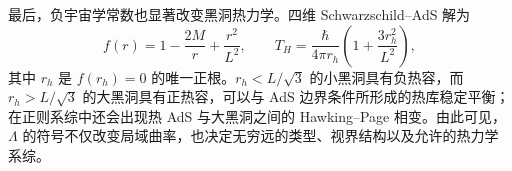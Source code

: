 最后，负宇宙学常数也显著改变黑洞热力学。四维 Schwarzschild--AdS 解为
\begin{equation}\label{eq:schwarzschild-AdS}
    f(r)=1-\frac{2M}{r}+\frac{r^2}{L^2},
    \qquad
    T_H=\frac{\hbar}{4\pi r_h}
      \left(1+\frac{3r_h^2}{L^2}\right),
\end{equation}
其中 $r_h$ 是 $f(r_h)=0$ 的唯一正根。$r_h<L/\sqrt3$ 的小黑洞具有负热容，而 $r_h>L/\sqrt3$ 的大黑洞具有正热容，可以与 AdS 边界条件所形成的热库稳定平衡；在正则系综中还会出现热 AdS 与大黑洞之间的 Hawking--Page 相变。由此可见，$\Lambda$ 的符号不仅改变局域曲率，也决定无穷远的类型、视界结构以及允许的热力学系综。
